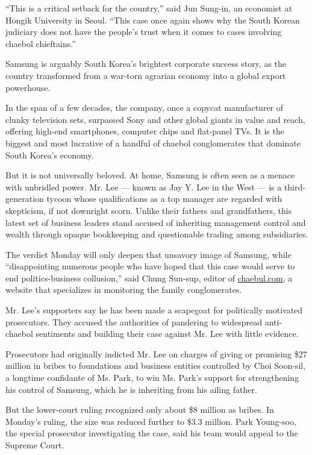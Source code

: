 ``This is a critical setback for the country,'' said Jun Sung-in, an
economist at Hongik University in Seoul. ``This case once again shows
why the South Korean judiciary does not have the people's trust when it
comes to cases involving chaebol chieftains.''

Samsung is arguably South Korea's brightest corporate success story, as
the country transformed from a war-torn agrarian economy into a global
export powerhouse.

In the span of a few decades, the company, once a copycat manufacturer
of clunky television sets, surpassed Sony and other global giants in
value and reach, offering high-end smartphones, computer chips and
flat-panel TVs. It is the biggest and most lucrative of a handful of
chaebol conglomerates that dominate South Korea's economy.

But it is not universally beloved. At home, Samsung is often seen as a
menace with unbridled power. Mr. Lee --- known as Jay Y. Lee in the West
--- is a third-generation tycoon whose qualifications as a top manager
are regarded with skepticism, if not downright scorn. Unlike their
fathers and grandfathers, this latest set of business leaders stand
accused of inheriting management control and wealth through opaque
bookkeeping and questionable trading among subsidiaries.

The verdict Monday will only deepen that unsavory image of Samsung,
while ``disappointing numerous people who have hoped that this case
would serve to end politics-business collusion,'' said Chung Sun-sup,
editor of \href{http://chaebul.com/}{chaebul.com}, a website that
specializes in monitoring the family conglomerates.

Mr. Lee's supporters say he has been made a scapegoat for politically
motivated prosecutors. They accused the authorities of pandering to
widespread anti-chaebol sentiments and building their case against Mr.
Lee with little evidence.

Prosecutors had originally indicted Mr. Lee on charges of giving or
promising \$27 million in bribes to foundations and business entities
controlled by Choi Soon-sil, a longtime confidante of Ms. Park, to win
Ms. Park's support for strengthening his control of Samsung, which he is
inheriting from his ailing father.

But the lower-court ruling recognized only about \$8 million as bribes.
In Monday's ruling, the size was reduced further to \$3.3 million. Park
Young-soo, the special prosecutor investigating the case, said his team
would appeal to the Supreme Court.

